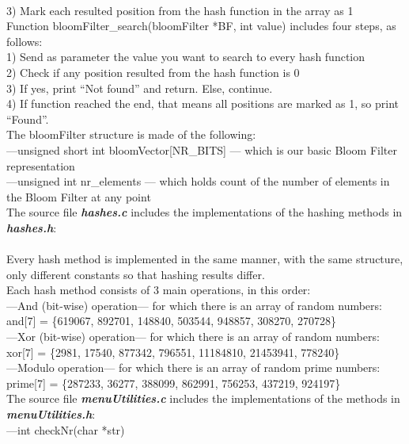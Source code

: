 \documentclass[14pt]{article}
\begin{document}
\\3) Mark each resulted position from the hash function in the array as 1
\vspace{2 mm}
\\Function bloomFilter\_search(bloomFilter *BF, int value) includes four steps, as follows:
\\1) Send as parameter the value you want to search to every hash function
\\2) Check if any position resulted from the hash function is 0
\\3) If yes, print ``Not found'' and return. Else, continue.
\\4) If function reached the end, that means all positions are marked as 1, so print ``Found''.
\vspace{10 mm}
\\ The bloomFilter structure is made of the following:
\\---unsigned short int bloomVector[NR\_BITS] --- which is our basic Bloom Filter representation
\\---unsigned int nr\_elements --- which holds count of the number of elements in the Bloom Filter at any point
\vspace{3 mm}
\\The source file \textbf{\textit{hashes.c}} includes the implementations of the hashing methods in \textbf{\textit{hashes.h}}:
\\
\\Every hash method is implemented in the same manner, with the same structure, only different constants so that hashing results differ.
\\Each hash method consists of 3 main operations, in this order:
\\---And (bit-wise) operation--- for which there is an array of random numbers: and[7] = \{619067, 892701, 148840, 503544, 948857, 308270, 270728\}
\\---Xor (bit-wise) operation--- for which there is an array of random numbers: xor[7] = \{2981, 17540, 877342, 796551, 11184810, 21453941, 778240\}
\\---Modulo operation--- for which there is an array of random prime numbers: prime[7] = \{287233, 36277, 388099, 862991, 756253, 437219, 924197\}
\vspace{3 mm}
\\The source file \textbf{\textit{menuUtilities.c}} includes the implementations of the methods in \textbf{\textit{menuUtilities.h}}:
\\---int checkNr(char *str)
\end{document}
